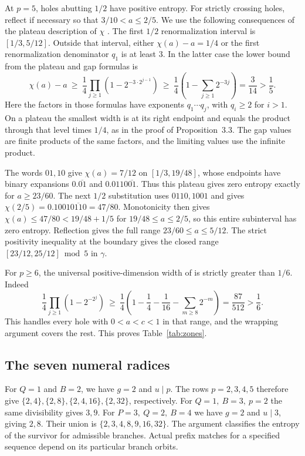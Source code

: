 \documentclass[11pt,reqno,a4paper]{amsart}
\theoremstyle{remark}
\begin{document}
At \(p=5\), holes abutting \(1/2\) have positive entropy.
For strictly crossing holes, reflect if necessary so that
\(3/10<a\le2/5\). We use the following consequences of the
plateau description of \(\chi\)
\cite[Theorem~2.13 and Proposition~3.3]{app-glendinning-sidorov}.
The first \(1/2\) renormalization interval is
\([1/3,5/12]\). Outside that interval, either \(\chi(a)-a=1/4\)
or the first renormalization denominator \(q_1\) is at least \(3\).
In the latter case the lower bound from the plateau and gap
formulas is
\[
 \chi(a)-a\ \ge\
 \frac14\prod_{j\ge1}(1-2^{-3\cdot 2^{j-1}})
 \ \ge\ \frac14\left(1-\sum_{j\ge1}2^{-3j}\right)
 =\frac{3}{14}>\frac15 .
\]
Here the factors in those formulas have exponents \(q_1\cdots q_j\),
with \(q_i\ge2\) for \(i>1\). On a plateau the smallest width is
at its right endpoint and equals the product through that level
times \(1/4\), as in the proof of Proposition~3.3. The gap values
are finite products of the same factors, and the limiting
values use the infinite product.

The words \(01,10\) give
\(\chi(a)=7/12\) on \([1/3,19/48]\), whose endpoints have binary
expansions \(0.\overline{01}\) and \(0.0110\overline{01}\).
Thus this plateau gives zero entropy exactly for
\(a\ge23/60\). The next \(1/2\) substitution uses \(0110,1001\)
and gives
\(\chi(2/5)=0.1001\overline{0110}=47/80\).
Monotonicity then gives \(\chi(a)\le47/80<19/48+1/5\) for
\(19/48\le a\le2/5\), so this entire subinterval has zero entropy.
Reflection gives the full range \(23/60\le a\le5/12\).
The strict positivity inequality at the boundary gives the
closed range \([23/12,25/12]\bmod 5\) in \(\gamma\).

For \(p\ge6\), the universal positive-dimension width of
\cite[Corollary~3.9]{app-glendinning-sidorov} is strictly greater
than \(1/6\). Indeed
\[
 \frac14\prod_{j\ge1}(1-2^{-2^j})
 \ \ge\ \frac14\left(1-\frac14-\frac1{16}
                         -\sum_{m\ge8}2^{-m}\right)
 =\frac{87}{512}>\frac16 .
\]
This handles every hole with \(0<a<c<1\) in that range, and the
wrapping argument covers the rest. This proves Table~\ref{tab:zones}.

\subsection{The seven numeral radices}

For \(Q=1\) and \(B=2\), we have \(g=2\) and \(u\mid p\).
The rows \(p=2,3,4,5\) therefore give
\(\{2,4\},\{2,8\},\{2,4,16\},\{2,32\}\), respectively.
For \(Q=1,\ B=3,\ p=2\) the same divisibility gives \(3,9\).
For \(P=3,\ Q=2,\ B=4\) we have \(g=2\) and \(u\mid3\), giving
\(2,8\). Their union is \(\{2,3,4,8,9,16,32\}\). The argument
classifies the entropy of the survivor for admissible branches.
Actual prefix matches for a specified sequence depend on its
particular branch orbits.
\end{document}
